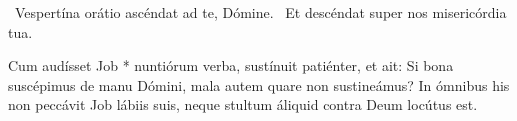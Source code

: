 


\V\ Vespertína orátio ascéndat ad te, Dómine. \R\ Et descéndat super nos misericórdia tua.

 Cum audísset Job * nuntiórum verba, sustínuit patiénter, et ait: Si bona suscépimus de manu Dómini, mala autem quare non sustineámus? In ómnibus his non peccávit Job lábiis suis, neque stultum áliquid contra Deum locútus est.


